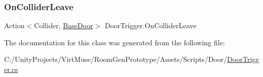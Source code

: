 \subsubsection{\texorpdfstring{On\+Collider\+Leave}{OnColliderLeave}}
{\footnotesize\ttfamily Action$<$Collider, \mbox{\hyperlink{class_base_door}{Base\+Door}}$>$ Door\+Trigger.\+On\+Collider\+Leave}



The documentation for this class was generated from the following file\+:\begin{DoxyCompactItemize}
\item 
C\+:/\+Unity\+Projects/\+Virt\+Muse/\+Room\+Gen\+Prototype/\+Assets/\+Scripts/\+Door/\mbox{\hyperlink{_door_trigger_8cs}{Door\+Trigger.\+cs}}\end{DoxyCompactItemize}
